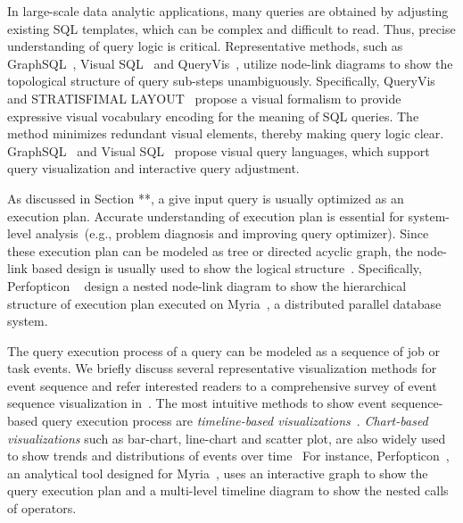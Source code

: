 In large-scale data analytic applications, many queries are obtained by adjusting existing SQL templates, which can be complex and difficult to read. 
Thus, precise understanding of query logic is critical.
Representative methods, such as GraphSQL~\cite{cerullo2007system}, Visual SQL~\cite{jaakkola2003visual} and QueryVis~\cite{leventidis2020queryvis}, utilize node-link diagrams to show the topological structure of query sub-steps unambiguously. Specifically, QueryVis~\cite{leventidis2020queryvis} and STRATISFIMAL LAYOUT~\cite{di2021stratisfimal} propose a visual formalism to provide expressive visual vocabulary encoding for the meaning of SQL queries. The method minimizes redundant visual elements, thereby making query logic clear. GraphSQL~\cite{cerullo2007system} and Visual SQL~\cite{jaakkola2003visual} propose visual query languages, which support query visualization and interactive query adjustment. 

As discussed in Section **, a give input query is usually optimized as an execution plan. Accurate understanding of execution plan is essential for system-level analysis~(e.g., problem diagnosis and improving query optimizer). 
Since these execution plan can be modeled as tree or directed acyclic graph, the node-link based design is usually used to show the logical structure~\cite{tezui, sparkui, moritz2015perfopticon, battle2016making, simitsis2014vqa}. Specifically, Perfopticon ~\cite{moritz2015perfopticon} design a nested node-link diagram to show the hierarchical structure of execution plan executed on Myria~\cite{halperin2014demonstration}, a distributed parallel database system. 

The query execution process of a query can be modeled as a sequence of job or task events.
We briefly discuss several representative visualization methods for event sequence and refer interested readers to a comprehensive survey of event sequence visualization in~\cite{guo2021survey}. 
The most intuitive methods to show event sequence-based query execution process are \textit{timeline-based visualizations}~\cite{tezui, sparkui, moritz2015perfopticon, battle2016making, sakin2022traveler}.
\textit{Chart-based visualizations} such as bar-chart, line-chart and scatter plot, are also widely used to show trends and distributions of events over time~\cite{wu2020visual, malik2016high, gotz2019visual, sigovan2013visualizing, chen2014visual, micallef2017towards}
For instance, Perfopticon~\cite{moritz2015perfopticon}, an analytical tool designed for Myria~\cite{halperin2014demonstration}, uses an interactive graph to show the query execution plan and a multi-level timeline diagram to show the nested calls of operators.


